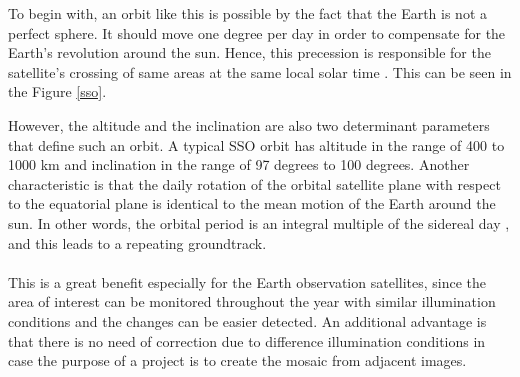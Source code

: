 \begin{itemize}
\begin{itemize}
	To begin with, an orbit like this is possible by the fact that the Earth is not a perfect sphere. It should move one degree per day in order to compensate for the Earth's revolution around the sun. Hence, this precession is responsible for the satellite's crossing of same areas at the same local solar time \cite{Meseguer, Kramer 2002}. This can be seen in the Figure \ref{sso}.
	
	However, the altitude and the inclination are also two determinant parameters that define such an orbit. A typical SSO orbit has altitude in the range of 400 to 1000 km and inclination in the range of 97 degrees to 100 degrees. Another characteristic is that the daily rotation of the orbital satellite plane with respect to the equatorial plane is identical to the mean motion of the Earth around the sun. In other words, the orbital period is an integral multiple of the sidereal day \cite{Campbell}, and this leads to a repeating groundtrack.\\ %
	\\
	This is a great benefit especially for the Earth observation satellites, since the area of interest can be monitored throughout the year with similar illumination conditions and the changes can be easier detected. An additional advantage is that there is no need of correction due to difference illumination conditions in case the purpose of a project is to create the mosaic from adjacent images. \\

\end{itemize}
\end{itemize}
